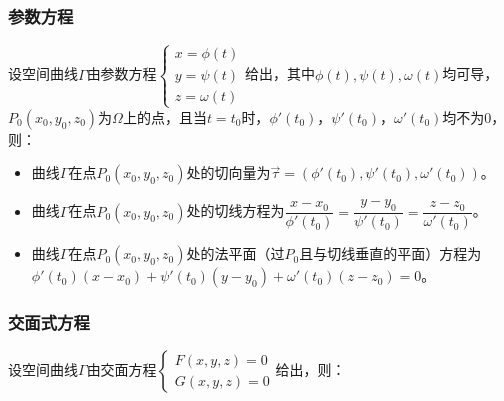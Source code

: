 \documentclass[UTF8, 12pt]{ctexart}
\begin{document}
\subsubsection{参数方程}

设空间曲线$\varGamma$由参数方程$\left\{\begin{array}{l}
    x=\phi(t) \\
    y=\psi(t) \\
    z=\omega(t)
\end{array}\right.$给出，其中$\phi(t),\psi(t),\omega(t)$均可导，$P_0(x_0,y_0,z_0)$为$\varOmega$上的点，且当$t=t_0$时，$\phi'(t_0)$，$\psi'(t_0)$，$\omega'(t_0)$均不为0，则：

\begin{itemize}
    \item 曲线$\varGamma$在点$P_0(x_0,y_0,z_0)$处的切向量为$\vec{\tau}=(\phi'(t_0),\psi'(t_0),\omega'(t_0))$。
    \item 曲线$\varGamma$在点$P_0(x_0,y_0,z_0)$处的切线方程为$\dfrac{x-x_0}{\phi'(t_0)}=\dfrac{y-y_0}{\psi'(t_0)}=\dfrac{z-z_0}{\omega'(t_0)}$。
    \item 曲线$\varGamma$在点$P_0(x_0,y_0,z_0)$处的法平面（过$P_0$且与切线垂直的平面）方程为$\phi'(t_0)(x-x_0)+\psi'(t_0)(y-y_0)+\omega'(t_0)(z-z_0)=0$。
\end{itemize}

\subsubsection{交面式方程}

设空间曲线$\varGamma$由交面方程$\left\{\begin{array}{l}
    F(x,y,z)=0 \\
    G(x,y,z)=0
\end{array}\right.$给出，则：
\end{document}
